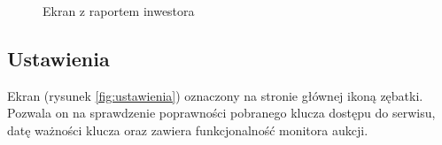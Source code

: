 \documentclass[a4paper,twoside,titlepage,openright]{book}
\begin{document}
\begin{figure}[h!]
\begin{minipage}[t]{0.3\textwidth}
		\caption{Ekran z raportem inwestora}
		\label{fig:raportInwestora}
	\end{minipage}
\end{figure}

\subsection{Ustawienia}
Ekran (rysunek \ref{fig:ustawienia}) oznaczony na stronie głównej ikoną zębatki. Pozwala on na sprawdzenie poprawności pobranego klucza dostępu do serwisu, datę ważności klucza oraz zawiera funkcjonalność monitora aukcji. 
\end{document}
